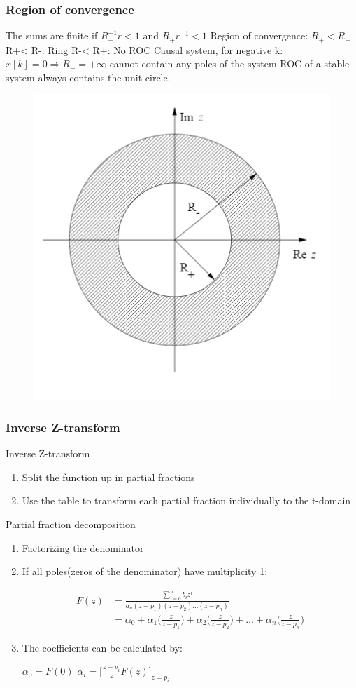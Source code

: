 \begin{frame}
\frametitle{Region of convergence}
The sums are finite if $R_{-}^{-1}r < 1$ and $R_{+}r^{-1} < 1$
Region of convergence: $R_{+} < R_{-}$
R+< R-: Ring
R-< R+: No ROC
Causal system, for negative k:
$x[k] = 0 \Rightarrow R_{-} = + \infty$
cannot contain any poles of the system
ROC of a stable system always contains
the unit circle.
\begin{figure}
\centering
\includegraphics[width=0.4\linewidth]{Images/discrete_time_systems_24}
\caption{}
\label{fig:discrete_time_systems_24}
\end{figure}

\end{frame}
\begin{frame}
	\frametitle{Inverse Z-transform}
	\begin{block}{Inverse Z-transform}
		\begin{enumerate}
			\item Split the function up in partial fractions
			\item Use the table to transform each partial fraction individually to the t-domain
		\end{enumerate}
	\end{block}
	
\end{frame}
\begin{frame}
	\begin{block}{Partial fraction decomposition}
		\begin{enumerate}
			\item Factorizing the denominator
			\item If all poles(zeros of the denominator) have multiplicity 1:
			\vspace{-2 em}
			\begin{center}
				\begin{align}
				F(z) &= \frac{\sum\limits_{i=0}^{n} b_i z^{i}}{a_n(z-p_1)(z-p_2) \dots (z-p_n)}\\
				&= \alpha_0 + \alpha_1 \bigg(\frac{z}{z-p_1}\bigg) + \alpha_2 \bigg(\frac{z}{z-p_2}\bigg) + \dots + \alpha_n \bigg(\frac{z}{z-p_n}\bigg)
				\end{align}
			\end{center}
			\item The coefficients can be calculated by:\\
			\begin{center}
				$\alpha_0 = F(0)$		$\alpha_i = \bigg[\frac{z-p_i}{z} F(z)\bigg]_{z=p_i}$
			\end{center}
			\setcounter{enumTemp}{\theenumi}
		\end{enumerate}
	\end{block}
\end{frame}
